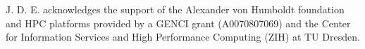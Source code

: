 \documentclass[journal=langd5,manuscript=article]{achemso}
\begin{document}


  




\begin{acknowledgement}
  J. D. E. acknowledges the support of the Alexander von Humboldt foundation and HPC platforms provided by a GENCI grant (A0070807069) and the Center for Information Services and High Performance Computing (ZIH) at TU Dresden.
\end{acknowledgement}





\end{document}
